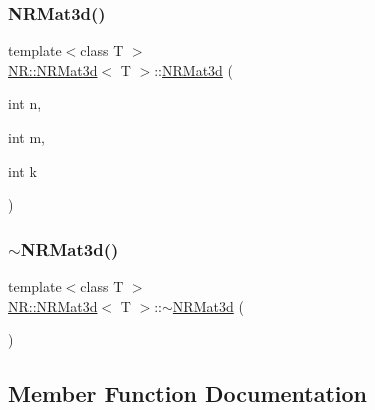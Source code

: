 \mbox{\label{classNR_1_1NRMat3d_a72437875f6affe5898dee887c3ebfe4c}} 
\subsubsection{\texorpdfstring{NRMat3d()}{NRMat3d()}\hspace{0.1cm}{\footnotesize\ttfamily [6/6]}}
{\footnotesize\ttfamily template$<$class T $>$ \\
\mbox{\hyperlink{classNR_1_1NRMat3d}{N\+R\+::\+N\+R\+Mat3d}}$<$ T $>$\+::\mbox{\hyperlink{classNR_1_1NRMat3d}{N\+R\+Mat3d}} (\begin{DoxyParamCaption}\item[{int}]{n,  }\item[{int}]{m,  }\item[{int}]{k }\end{DoxyParamCaption})}

\mbox{\label{classNR_1_1NRMat3d_a6c8dc36e24e162855f99ccfbc380ff52}} 
\subsubsection{\texorpdfstring{$\sim$NRMat3d()}{~NRMat3d()}\hspace{0.1cm}{\footnotesize\ttfamily [3/3]}}
{\footnotesize\ttfamily template$<$class T $>$ \\
\mbox{\hyperlink{classNR_1_1NRMat3d}{N\+R\+::\+N\+R\+Mat3d}}$<$ T $>$\+::$\sim$\mbox{\hyperlink{classNR_1_1NRMat3d}{N\+R\+Mat3d}} (\begin{DoxyParamCaption}{ }\end{DoxyParamCaption})}



\subsection{Member Function Documentation}
\mbox{\label{classNR_1_1NRMat3d_ae46651c069e6954e03e5d3a39ffd2891}} 
